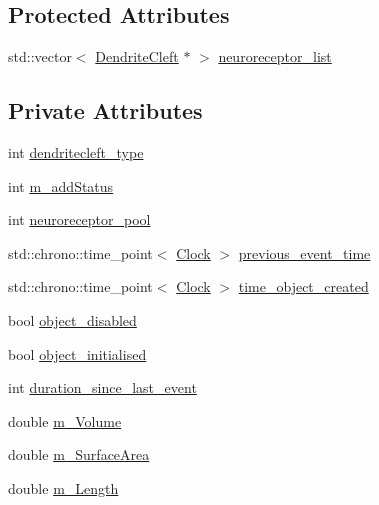 \subsection*{Protected Attributes}
\begin{DoxyCompactItemize}
\item 
std\+::vector$<$ \mbox{\hyperlink{classDendriteCleft}{Dendrite\+Cleft}} $\ast$ $>$ \mbox{\hyperlink{classDendriteCleft_a42de9c556ce58c9f511031361755a0c3}{neuroreceptor\+\_\+list}}
\end{DoxyCompactItemize}
\subsection*{Private Attributes}
\begin{DoxyCompactItemize}
\item 
int \mbox{\hyperlink{classDendriteCleft_ab5f89d395d4f77f7d23cd15425f0de6b}{dendritecleft\+\_\+type}}
\item 
int \mbox{\hyperlink{classDendriteCleft_aaaf447d15eebe2a304ee03a62cc97c05}{m\+\_\+add\+Status}}
\item 
int \mbox{\hyperlink{classDendriteCleft_afd7b84cb30b571db5d42130915a27033}{neuroreceptor\+\_\+pool}}
\item 
std\+::chrono\+::time\+\_\+point$<$ \mbox{\hyperlink{universe_8h_a0ef8d951d1ca5ab3cfaf7ab4c7a6fd80}{Clock}} $>$ \mbox{\hyperlink{classDendriteCleft_a97d85edbb69960d16398d212107c36fb}{previous\+\_\+event\+\_\+time}}
\item 
std\+::chrono\+::time\+\_\+point$<$ \mbox{\hyperlink{universe_8h_a0ef8d951d1ca5ab3cfaf7ab4c7a6fd80}{Clock}} $>$ \mbox{\hyperlink{classDendriteCleft_a145dcc0e5e2564e22464625930c006c9}{time\+\_\+object\+\_\+created}}
\item 
bool \mbox{\hyperlink{classDendriteCleft_ac457de5e25a7c7e29db9d50f0874f078}{object\+\_\+disabled}}
\item 
bool \mbox{\hyperlink{classDendriteCleft_a246dda1826ad0fd93002388993899e10}{object\+\_\+initialised}}
\item 
int \mbox{\hyperlink{classDendriteCleft_aef90c83b99d8a74e0aa05e845a8e07b6}{duration\+\_\+since\+\_\+last\+\_\+event}}
\item 
double \mbox{\hyperlink{classDendriteCleft_a93155af6d9d9179eb0608ee0cbf90e8c}{m\+\_\+\+Volume}}
\item 
double \mbox{\hyperlink{classDendriteCleft_aabf37b96644ddc07d3195d6c2ebc60e8}{m\+\_\+\+Surface\+Area}}
\item 
double \mbox{\hyperlink{classDendriteCleft_a6876a474554771833ea179fbc8d8cd62}{m\+\_\+\+Length}}

\end{DoxyCompactItemize}
